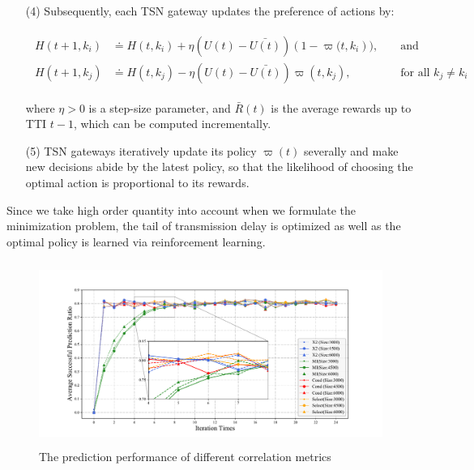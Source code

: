 \documentclass{SCIS2021}
\begin{document}
	\begin{itemize}[itemsep=15 pt,topsep = -1.5 pt]
		\item[(4)]
		Subsequently, each TSN gateway updates the  preference of actions by:\\
		\setlength\abovedisplayskip{-30pt}
		\begin{center}
			\begin{equation}
				\begin{aligned}
					\begin{aligned}
						H\left(t+1,k_{i}\right) & \doteq H(t,k_{i})+\eta\left(U(t)-\bar{U(t)}\right)\left(1-\varpi(t,k_{i}\right)), & & \text { and } \\ H(t+1,k_{j}) & \doteq H(t,k_{j})-\eta\left(U(t)-\bar{{U}(t)}\right) \varpi(t,k_{j}), & & \text { for all } k_{j} \neq k_{i} \end{aligned}
				\end{aligned}
			\end{equation}
		\end{center}
		\setlength\belowdisplayskip{-10pt}
		\vspace{-6pt}
		where $\eta>0$ is a step-size parameter, and $\bar{R}(t)$ is the average rewards up to TTI $t-1$, which can be computed incrementally\cite{sutton2018reinforcement}.
	\end{itemize}

	\begin{itemize}[itemsep= 15pt,topsep = -1 pt]
		\item[(5)]
		TSN gateways iteratively update its policy $\varpi(t)$ severally and make new decisions abide by the latest policy, so that the likelihood of choosing the optimal action is proportional to its rewards.
	\end{itemize}

	\par Since we take high order quantity into account when we formulate the minimization problem, the tail of transmission delay is optimized as well as the optimal policy is learned via reinforcement learning.


	\begin{figure}[b]
		\centering
		\includegraphics[height=6cm, width=11.5cm]{pre_accu}
		\caption{The prediction performance of different correlation metrics}
		\label{pic:prediction precision}
	\end{figure}
\end{document}
